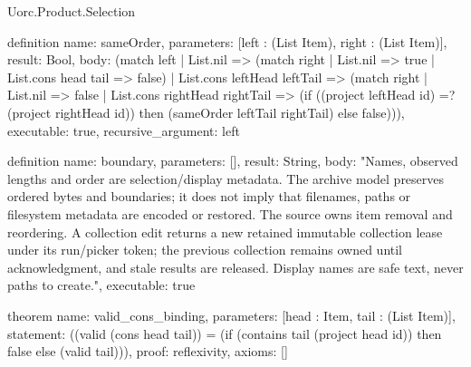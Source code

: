 \begin{lexlean}{Uorc.Product.Selection}
\begin{semanticmodule}
definition{
  name: sameOrder,
  parameters: [left : (List Item), right : (List Item)],
  result: Bool,
  body: (match left
    | List.nil => (match right | List.nil => true | List.cons head tail => false)
    | List.cons leftHead leftTail => (match right
      | List.nil => false
      | List.cons rightHead rightTail => (if ((project leftHead id) =? (project rightHead id)) then (sameOrder leftTail rightTail) else false))),
  executable: true,
  recursive_argument: left
}

definition{
  name: boundary,
  parameters: [],
  result: String,
  body: "Names, observed lengths and order are selection/display metadata. The archive model preserves ordered bytes and boundaries; it does not imply that filenames, paths or filesystem metadata are encoded or restored. The source owns item removal and reordering. A collection edit returns a new retained immutable collection lease under its run/picker token; the previous collection remains owned until acknowledgment, and stale results are released. Display names are safe text, never paths to create.",
  executable: true
}

theorem{
  name: valid_cons_binding,
  parameters: [head : Item, tail : (List Item)],
  statement: ((valid (cons head tail)) = (if (contains tail (project head id)) then false else (valid tail))),
  proof: reflexivity{},
  axioms: []
}
\end{semanticmodule}
\end{lexlean}
